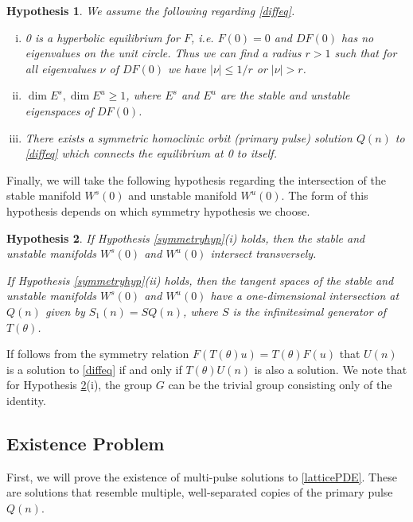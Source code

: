 \documentclass[12pt]{article}
\newtheorem{hypothesis}{Hypothesis}
\begin{document}
\begin{hypothesis}\label{initialhyp}
We assume the following regarding \eqref{diffeq}.
\begin{enumerate}[(i)]
\item 0 is a hyperbolic equilibrium for $F$, i.e. $F(0) = 0$ and $DF(0)$ has no eigenvalues on the unit circle. Thus we can find a radius $r > 1$ such that for all eigenvalues $\nu$ of $DF(0)$ we have $|\nu| \leq 1/r$ or $|\nu| > r$.
\item $\dim E^s, \dim E^u \geq 1$, where $E^s$ and $E^u$ are the stable and unstable eigenspaces of $DF(0)$.
\item There exists a symmetric homoclinic orbit (primary pulse) solution $Q(n)$ to \eqref{diffeq} which connects the equilibrium at 0 to itself.
\end{enumerate}
\end{hypothesis}

Finally, we will take the following hypothesis regarding the intersection of the stable manifold $W^s(0)$ and unstable manifold $W^u(0)$. The form of this hypothesis depends on which symmetry hypothesis we choose.

\begin{hypothesis}\label{intersectionhyp}
If Hypothesis \ref{symmetryhyp}(i) holds, then the stable and unstable manifolds $W^s(0)$ and $W^u(0)$ intersect transversely.

If Hypothesis \ref{symmetryhyp}(ii) holds, then the tangent spaces of the stable and unstable manifolds $W^s(0)$ and $W^u(0)$ have a one-dimensional intersection at $Q(n)$ given by $S_1(n) = S Q(n)$, where $S$ is the infinitesimal generator of $T(\theta)$.
\end{hypothesis}

If follows from the symmetry relation $F(T(\theta)u) = T(\theta)F(u)$ that $U(n)$ is a solution to \eqref{diffeq} if and only if $T(\theta)U(n)$ is also a solution. We note that for Hypothesis \ref{intersectionhyp}(i), the group $G$ can be the trivial group consisting only of the identity.

\subsection{Existence Problem}
First, we will prove the existence of multi-pulse solutions to \eqref{latticePDE}. These are solutions that resemble multiple, well-separated copies of the primary pulse $Q(n)$.
\end{document}
